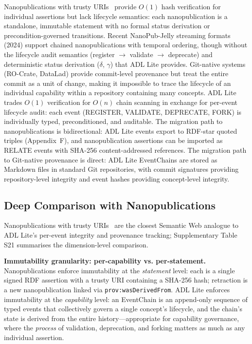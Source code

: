 Nanopublications with trusty URIs~\cite{nanopub2023} provide $O(1)$ hash verification for individual assertions but lack lifecycle semantics: each nanopublication is a standalone, immutable statement with no formal status derivation or precondition-governed transitions. Recent NanoPub-Jelly streaming formats (2024) support chained nanopublications with temporal ordering, though without the lifecycle audit semantics (register $ \to $ validate $ \to $ deprecate) and deterministic status derivation ($\delta$, $\gamma$) that ADL Lite provides. Git-native systems (RO-Crate, DataLad) provide commit-level provenance but treat the entire commit as a unit of change, making it impossible to trace the lifecycle of an individual capability within a repository containing many concepts. ADL Lite trades $O(1)$ verification for $O(n)$ chain scanning in exchange for per-event lifecycle audit: each event (REGISTER, VALIDATE, DEPRECATE, FORK) is individually typed, preconditioned, and auditable. The migration path to nanopublications is bidirectional: ADL Lite events export to RDF-star quoted triples (Appendix~F), and nanopublication assertions can be imported as RELATE events with SHA-256 content-addressed references. The migration path to Git-native provenance is direct: ADL Lite EventChains are stored as Markdown files in standard Git repositories, with commit signatures providing repository-level integrity and event hashes providing concept-level integrity.

\subsection{Deep Comparison with Nanopublications}\label{subsec:nanopub-comparison}

Nanopublications with trusty URIs~\cite{nanopub2023} are the closest Semantic Web analogue to ADL Lite's per-event integrity and provenance tracking; Supplementary Table S21 summarises the dimension-level comparison.

\textbf{Immutability granularity: per-capability vs. per-statement.} Nanopublications enforce immutability at the \emph{statement} level: each is a single signed RDF assertion with a trusty URI containing a SHA-256 hash; retraction is a new nanopublication linked via \texttt{prov:wasDerivedFrom}. ADL Lite enforces immutability at the \emph{capability} level: an EventChain is an append-only sequence of typed events that collectively govern a single concept's lifecycle, and the chain's state is derived from the entire history---appropriate for capability governance, where the \emph{process} of validation, deprecation, and forking matters as much as any individual assertion.

